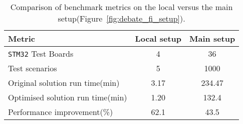 \begin{table}[H]
	\centering
	\begin{tabular}{@{}lcc@{}} %
		\toprule
		\textbf{Metric} & \textbf{Local setup} & \textbf{Main setup} \\
		\midrule
		\texttt{STM32} Test Boards & 4 & 36 \\
		Test scenarios & 5 & 1000 \\
		Original solution run time(min) & 3.17 & 234.47 \\
		Optimised solution run time(min) & 1.20 & 132.4 \\
		Performance improvement(\%) & 62.1 & 43.5 \\
		\bottomrule
	\end{tabular}
	\caption{Comparison of benchmark metrics on the local versus the main setup(Figure~\ref{fig:debate_fi_setup}).}
	\label{tab:debate_metrics}
\end{table}